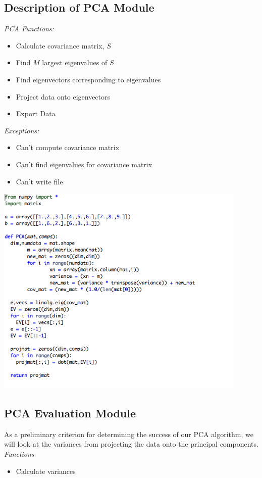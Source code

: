 \documentclass[12pt]{article} %
\begin{document}
\subsection{Description of PCA Module}
\emph{PCA Functions:}
\begin{itemize}
	\item Calculate covariance matrix, $S$
	\item Find $M$ largest eigenvalues of $S$
	\item Find eigenvectors corresponding to eigenvalues 
	\item Project data onto eigenvectors
	\item Export Data 
\end{itemize}

\emph{Exceptions:}
\begin{itemize}
	\item Can't compute covariance matrix 
	\item Can't find eigenvalues for covariance matrix
	\item Can't write file 
\end{itemize}

\begin{center}
\includegraphics[width=120mm]{claudia5.png}
\end{center}

\subsection{PCA Evaluation Module}
As a preliminary criterion for determining the success of our PCA algorithm, we will look at the variances from projecting the data onto the principal components.
\emph{Functions}
\begin{itemize}
	\item Calculate variances 
\end{itemize}
\end{document}
